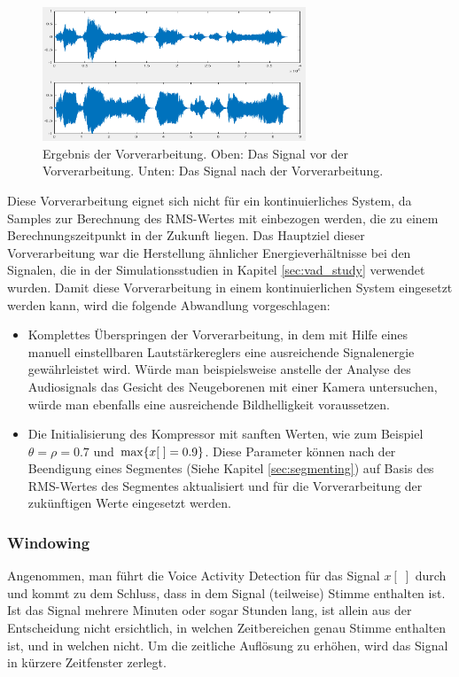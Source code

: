 \begin{figure}[h]
	\centering
	\includegraphics[width=0.7\textwidth]{bilder/compressing01.png}
	\caption{Ergebnis der Vorverarbeitung. Oben: Das Signal vor der Vorverarbeitung. Unten: Das Signal nach der Vorverarbeitung.}
	\label{img:compressing01}
\end{figure}

Diese Vorverarbeitung eignet sich nicht für ein kontinuierliches System, da Samples zur Berechnung des RMS-Wertes mit einbezogen werden, die zu einem Berechnungszeitpunkt in der Zukunft liegen. Das Hauptziel dieser Vorverarbeitung war die Herstellung ähnlicher Energieverhältnisse bei den Signalen, die in der Simulationsstudien in Kapitel \ref{sec:vad_study} verwendet wurden. Damit diese Vorverarbeitung in einem kontinuierlichen System eingesetzt werden kann, wird die folgende Abwandlung vorgeschlagen:
\begin{itemize}
	\item Komplettes Überspringen der Vorverarbeitung, in dem mit Hilfe eines manuell einstellbaren Lautstärkereglers eine ausreichende Signalenergie gewährleistet wird. Würde man beispielsweise anstelle der Analyse des Audiosignals das Gesicht des Neugeborenen mit einer Kamera untersuchen, würde man ebenfalls eine ausreichende Bildhelligkeit voraussetzen.
	\item Die Initialisierung des Kompressor mit \grqq sanften Werten\grqq , wie zum Beispiel $\theta = \rho = 0.7$ und $\operatorname*{max}\{x[\;] = 0.9\}$. Diese Parameter können nach der Beendigung eines Segmentes (Siehe Kapitel \ref{sec:segmenting}) auf Basis des RMS-Wertes des Segmentes aktualisiert und für die Vorverarbeitung der zukünftigen Werte eingesetzt werden.
\end{itemize}

\subsubsection{Windowing}
\label{sec:windowing}

Angenommen, man führt die Voice Activity Detection für das Signal $x[\;]$ durch und kommt zu dem Schluss, dass in dem Signal (teilweise) Stimme enthalten ist. Ist das Signal mehrere Minuten oder sogar Stunden lang, ist allein aus der Entscheidung nicht ersichtlich, in welchen Zeitbereichen genau Stimme enthalten ist, und in welchen nicht. Um die zeitliche \glqq Auflösung\grqq{} zu erhöhen, wird das Signal in kürzere Zeitfenster zerlegt.

